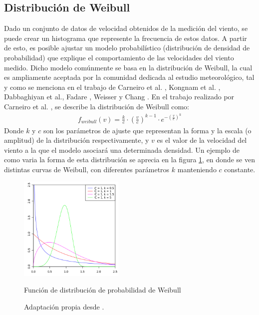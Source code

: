 \subsection{Distribución de Weibull}
Dado un conjunto de datos de velocidad obtenidos de la medición del viento, se puede crear un histograma que represente la frecuencia de estos datos. A partir de esto, es posible ajustar un modelo probabilístico (distribución de densidad de probabilidad) que explique el comportamiento de las velocidades del viento medido. Dicho modelo comúnmente se basa en la distribución de Weibull, la cual es ampliamente aceptada por la comunidad dedicada al estudio meteorológico, tal y como se menciona en el trabajo de Carneiro et al. \cite{Carneiro15}, Kongnam et al. \cite{Kongnam15}, Dabbaghiyan et al.\cite{Dabbaghiyan15}, Fadare \cite{Fadare08}, Weisser \cite{Weisser02} y Chang \cite{Chang10_2}. En el trabajo realizado por Carneiro et al. \cite{Carneiro15}, se describe la distribución de Weibull como: 
 \begin{align}\label{eq:weibull}
     f_{weibull}(v) = \frac{k}{c} \cdot (\frac{v}{c})^{k-1} \cdot e^{-(\frac{v}{c})^ k}
 \end{align}
 Donde $k$ y $c$ son los parámetros de ajuste que representan la forma y la escala (o amplitud) de la distribución respectivamente, y $v$ es el valor de la velocidad del viento a la que el modelo asociará una determinada densidad. Un ejemplo de como varia la forma de esta distribución se aprecia en la figura \ref{fig:weibull_fig}, en donde se ven distintas curvas de Weibull, con diferentes parámetros $k$ manteniendo $c$ constante.
\begin{figure}[h!]
    \centering    
    \includegraphics[height=50mm]{figures/weibull_distribution.png} 
    \caption{Función de distribución de probabilidad de Weibull}
    \vspace{-.25cm} 
    \caption*{Adaptación propia desde \cite{wikiWeibull}.}
    \label{fig:weibull_fig}
\end{figure}
